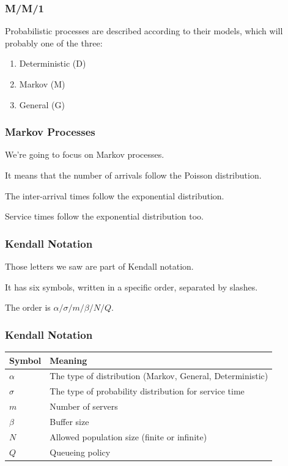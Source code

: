\begin{frame}
\frametitle{M/M/1}

Probabilistic processes are described according to their models, which will probably one of the three:

\begin{enumerate}
	\item Deterministic (D)	
	\item Markov (M)
	\item General (G)
\end{enumerate}

\end{frame}



\begin{frame}
\frametitle{Markov Processes}

We're going to focus on Markov processes. 

It means that the number of arrivals follow the Poisson distribution.

The inter-arrival times follow the exponential distribution. 

Service times follow the exponential distribution too. 

\end{frame}



\begin{frame}
\frametitle{Kendall Notation}

Those letters we saw are part of Kendall notation. 

It has six symbols, written in a specific order, separated by slashes. 

The order is $\alpha / \sigma / m / \beta / N / Q$. 

\end{frame}



\begin{frame}
\frametitle{Kendall Notation}

\begin{center}
\begin{tabular}{l|l} 
	\textbf{Symbol} & \textbf{Meaning} \\ \hline
	$\alpha$ & The type of distribution (Markov, General, Deterministic) \\ \hline
	$\sigma$ & The type of probability distribution for service time \\ \hline
	$m$ & Number of servers \\ \hline
	$\beta$ & Buffer size \\ \hline
	$N$ & Allowed population size (finite or infinite) \\ \hline
	$Q$ & Queueing policy \\ 
\end{tabular}
\end{center}

\end{frame}



